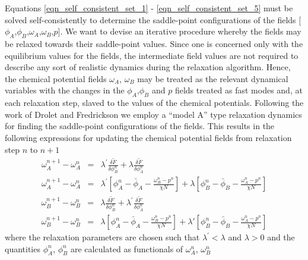 \documentclass[onecolumn,amsmath,amssymb,floatfix]{elsart}
\begin{document}
Equations \ref{eqn_self_consistent_set_1} -
\ref{eqn_self_consistent_set_5} must be solved self-consistently
to determine the saddle-point configurations of the fields
[$\phi_A$,$\phi_B$,$\omega_A$,$\omega_B$,$p$].
We want to devise
an iterative procedure whereby the fields may be relaxed towards
their saddle-point values.
Since one is concerned only with the
equilibrium values for the fields, the intermediate field values
are not required to describe any sort of realistic dynamics during
the relaxation algorithm.
Hence, the chemical potential fields
$\omega_A$, $\omega_B$ may be treated as the relevant dynamical
variables with the changes in the $\phi_A$,$\phi_B$ and $p$ fields
treated as fast modes and, at each relaxation step, slaved to the
values of the chemical potentials.
Following the work of Drolet and Fredrickson \cite{drolet99,glenn_review_02} we
employ a ``model A'' type relaxation dynamics
\cite{halperin_rev77} for finding the saddle-point configurations of the fields.
This results in the following expressions for updating the chemical potential
fields from relaxation step $n$ to $n+1$
%
 \begin{eqnarray}
 \label{eq_relaxation_scheme_2}
   \omega_A^{n+1} - \omega_A^{n}
   & = &
    \lambda^{'} \frac{\delta {\tilde F}}{\delta \phi_B^n} +
    \lambda     \frac{\delta {\tilde F}}{\delta \phi_A^n} \\
   \omega_A^{n+1} - \omega_A^{n}
   & = &
   \nonumber
    \lambda^{'} \left [ \phi_A^n - \bar{\phi}_A
                      - \frac{\omega_B^n - p^n}{\chi N}
                \right ] +
    \lambda     \left [ \phi_B^n - \bar{\phi}_B
                      - \frac{\omega_A^n - p^n}{\chi N}
                \right ]
 \end{eqnarray}
%
 \begin{eqnarray}
 \label{eq_relaxation_scheme_3}
   \omega_B^{n+1} - \omega_B^{n}
   & = &
    \lambda         \frac{\delta {\tilde F}}{\delta \phi_B^n} +
    \lambda^{'}     \frac{\delta {\tilde F}}{\delta \phi_A^n} \\
   \omega_B^{n+1} - \omega_B^{n}
   & = &
   \nonumber
    \lambda     \left [ \phi_A^n - \bar{\phi}_A
                      - \frac{\omega_B^n - p^n}{\chi N}
                \right ] +
    \lambda{'}  \left [ \phi_B^n - \bar{\phi}_B
                      - \frac{\omega_A^n - p^n}{\chi N}
                \right ]
 \end{eqnarray}
%
where the relaxation parameters are chosen such that
$\lambda^{'} < \lambda$ and $\lambda > 0$
and the quantities $\phi_A^n$, $\phi_B^n$
are calculated as functionals of $\omega_A^n$, $\omega_B^n$
\end{document}
